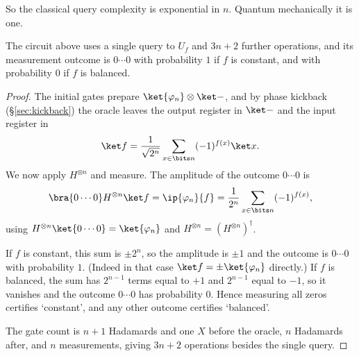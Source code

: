 So the classical query complexity is exponential in $n$. Quantum mechanically it is one.

\begin{center}
\end{center}

\begin{theorem}
	The circuit above uses a single query to $U_f$ and $3n+2$ further operations, and its measurement outcome is $0\cdots0$ with probability $1$ if $f$ is constant, and with probability $0$ if $f$ is balanced.
\end{theorem}

\begin{proof}
	The initial gates prepare $\ket{\varphi_n}\otimes\ket-$, and by phase kickback (\S\ref{sec:kickback}) the oracle leaves the output register in $\ket-$ and the input register in
	$$\ket f = \frac{1}{\sqrt{2^n}}\sum_{x\in\bits n}(-1)^{f(x)}\ket x.$$
	We now apply $H^{\otimes n}$ and measure. The amplitude of the outcome $0\cdots 0$ is
	$$\bra{0\cdots0}H^{\otimes n}\ket f = \ip{\varphi_n}{f} = \frac1{2^n}\sum_{x\in\bits n}(-1)^{f(x)},$$
	using $H^{\otimes n}\ket{0\cdots0} = \ket{\varphi_n}$ and $H^{\otimes n} = (H^{\otimes n})^\dagger$.

	If $f$ is constant, this sum is $\pm 2^n$, so the amplitude is $\pm1$ and the outcome is $0\cdots0$ with probability $1$. (Indeed in that case $\ket f = \pm\ket{\varphi_n}$ directly.) If $f$ is balanced, the sum has $2^{n-1}$ terms equal to $+1$ and $2^{n-1}$ equal to $-1$, so it vanishes and the outcome $0\cdots0$ has probability $0$. Hence measuring all zeros certifies `constant', and any other outcome certifies `balanced'.

	The gate count is $n+1$ Hadamards and one $X$ before the oracle, $n$ Hadamards after, and $n$ measurements, giving $3n+2$ operations besides the single query.
\end{proof}

